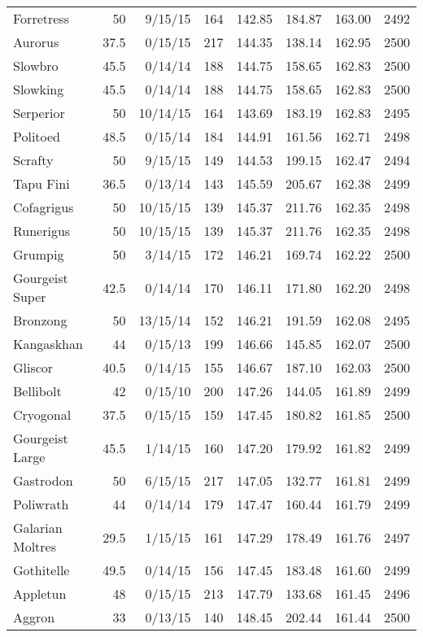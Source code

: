 \begin{longtable}{lrrrrrrr}
Forretress & 50 & 9/15/15 & 164 & 142.85 & 184.87 & 163.00 & 2492\\
Aurorus & 37.5 & 0/15/15 & 217 & 144.35 & 138.14 & 162.95 & 2500\\
Slowbro & 45.5 & 0/14/14 & 188 & 144.75 & 158.65 & 162.83 & 2500\\
Slowking & 45.5 & 0/14/14 & 188 & 144.75 & 158.65 & 162.83 & 2500\\
Serperior & 50 & 10/14/15 & 164 & 143.69 & 183.19 & 162.83 & 2495\\
Politoed & 48.5 & 0/15/14 & 184 & 144.91 & 161.56 & 162.71 & 2498\\
Scrafty & 50 & 9/15/15 & 149 & 144.53 & 199.15 & 162.47 & 2494\\
Tapu Fini & 36.5 & 0/13/14 & 143 & 145.59 & 205.67 & 162.38 & 2499\\
Cofagrigus & 50 & 10/15/15 & 139 & 145.37 & 211.76 & 162.35 & 2498\\
Runerigus & 50 & 10/15/15 & 139 & 145.37 & 211.76 & 162.35 & 2498\\
Grumpig & 50 & 3/14/15 & 172 & 146.21 & 169.74 & 162.22 & 2500\\
Gourgeist Super & 42.5 & 0/14/14 & 170 & 146.11 & 171.80 & 162.20 & 2498\\
Bronzong & 50 & 13/15/14 & 152 & 146.21 & 191.59 & 162.08 & 2495\\
Kangaskhan & 44 & 0/15/13 & 199 & 146.66 & 145.85 & 162.07 & 2500\\
Gliscor & 40.5 & 0/14/15 & 155 & 146.67 & 187.10 & 162.03 & 2500\\
Bellibolt & 42 & 0/15/10 & 200 & 147.26 & 144.05 & 161.89 & 2499\\
Cryogonal & 37.5 & 0/15/15 & 159 & 147.45 & 180.82 & 161.85 & 2500\\
Gourgeist Large & 45.5 & 1/14/15 & 160 & 147.20 & 179.92 & 161.82 & 2499\\
Gastrodon & 50 & 6/15/15 & 217 & 147.05 & 132.77 & 161.81 & 2499\\
Poliwrath & 44 & 0/14/14 & 179 & 147.47 & 160.44 & 161.79 & 2499\\
Galarian Moltres & 29.5 & 1/15/15 & 161 & 147.29 & 178.49 & 161.76 & 2497\\
Gothitelle & 49.5 & 0/14/15 & 156 & 147.45 & 183.48 & 161.60 & 2499\\
Appletun & 48 & 0/15/15 & 213 & 147.79 & 133.68 & 161.45 & 2496\\
Aggron & 33 & 0/13/15 & 140 & 148.45 & 202.44 & 161.44 & 2500\\

\end{longtable}
